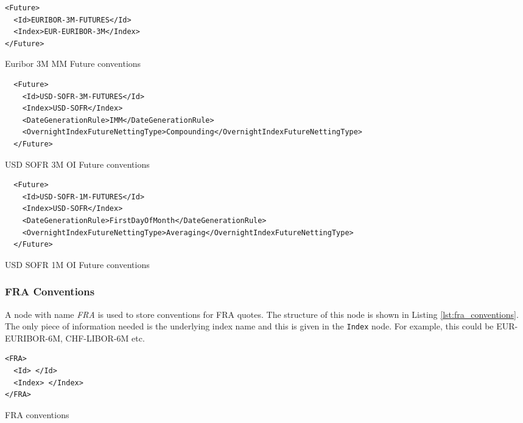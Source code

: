\begin{listing}[H]
\begin{verbatim}
<Future>
  <Id>EURIBOR-3M-FUTURES</Id>
  <Index>EUR-EURIBOR-3M</Index>
</Future>
\end{verbatim}
\caption{Euribor 3M MM Future conventions}
\label{lst:future_conventions_euribor_3m}
\end{listing}

\begin{listing}[H]
\begin{verbatim}
  <Future>
    <Id>USD-SOFR-3M-FUTURES</Id>
    <Index>USD-SOFR</Index>
    <DateGenerationRule>IMM</DateGenerationRule>
    <OvernightIndexFutureNettingType>Compounding</OvernightIndexFutureNettingType>
  </Future>
\end{verbatim}
\caption{USD SOFR 3M OI Future conventions}
\label{lst:future_conventions_sofr_3m}
\end{listing}

\begin{listing}[H]
\begin{verbatim}
  <Future>
    <Id>USD-SOFR-1M-FUTURES</Id>
    <Index>USD-SOFR</Index>
    <DateGenerationRule>FirstDayOfMonth</DateGenerationRule>
    <OvernightIndexFutureNettingType>Averaging</OvernightIndexFutureNettingType>
  </Future>
\end{verbatim}
\caption{USD SOFR 1M OI Future conventions}
\label{lst:future_conventions_sofr_1m}
\end{listing}


\subsubsection{FRA Conventions}
A node with name \emph{FRA} is used to store conventions for FRA quotes. The structure of this node is shown in Listing 
\ref{lst:fra_conventions}. The only piece of information needed is the underlying index name and this is given in the 
\lstinline!Index! node. For example, this could be EUR-EURIBOR-6M, CHF-LIBOR-6M etc.

\begin{listing}[H]
\begin{verbatim}
<FRA>
  <Id> </Id>
  <Index> </Index>
</FRA>
\end{verbatim}
\caption{FRA conventions}
\label{lst:fra_conventions}
\end{listing}


